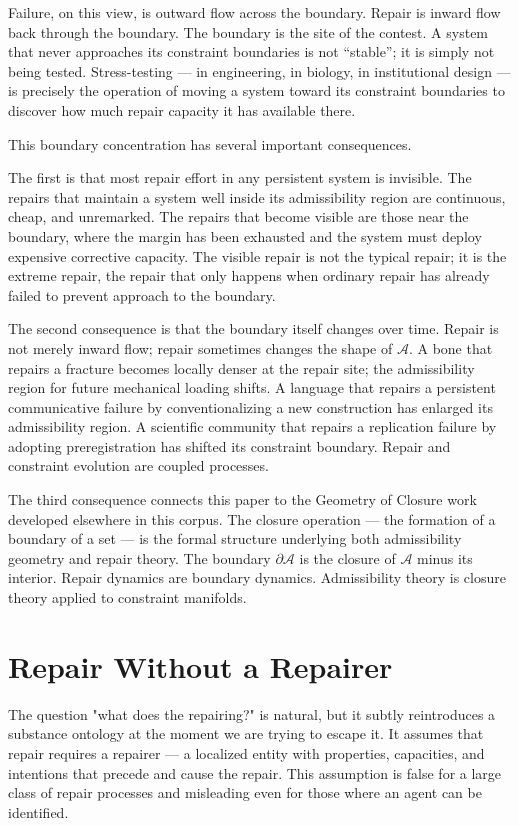 \documentclass[11pt, a4paper]{article}
\theoremstyle{definition}
\theoremstyle{remark}
\begin{document}
Failure, on this view, is outward flow across the boundary. Repair is inward
flow back through the boundary. The boundary is the site of the contest. A
system that never approaches its constraint boundaries is not ``stable''; it
is simply not being tested. Stress-testing --- in engineering, in biology, in
institutional design --- is precisely the operation of moving a system toward
its constraint boundaries to discover how much repair capacity it has available
there.

This boundary concentration has several important consequences.

The first is that most repair effort in any persistent system is invisible. The
repairs that maintain a system well inside its admissibility region are
continuous, cheap, and unremarked. The repairs that become visible are those
near the boundary, where the margin has been exhausted and the system must
deploy expensive corrective capacity. The visible repair is not the typical
repair; it is the extreme repair, the repair that only happens when ordinary
repair has already failed to prevent approach to the boundary.

The second consequence is that the boundary itself changes over time. Repair
is not merely inward flow; repair sometimes changes the shape of $\mathcal{A}$.
A bone that repairs a fracture becomes locally denser at the repair site;
the admissibility region for future mechanical loading shifts. A language that
repairs a persistent communicative failure by conventionalizing a new
construction has enlarged its admissibility region. A scientific community that
repairs a replication failure by adopting preregistration has shifted its
constraint boundary. Repair and constraint evolution are coupled processes.

The third consequence connects this paper to the Geometry of Closure work
developed elsewhere in this corpus. The closure operation --- the formation of
a boundary of a set --- is the formal structure underlying both admissibility
geometry and repair theory. The boundary $\partial\mathcal{A}$ is the closure
of $\mathcal{A}$ minus its interior. Repair dynamics are boundary dynamics.
Admissibility theory is closure theory applied to constraint manifolds.

\section{Repair Without a Repairer}

The question "what does the repairing?" is natural, but it subtly reintroduces
a substance ontology at the moment we are trying to escape it. It assumes that
repair requires a repairer --- a localized entity with properties, capacities,
and intentions that precede and cause the repair. This assumption is false for
a large class of repair processes and misleading even for those where an agent
can be identified.
\end{document}
